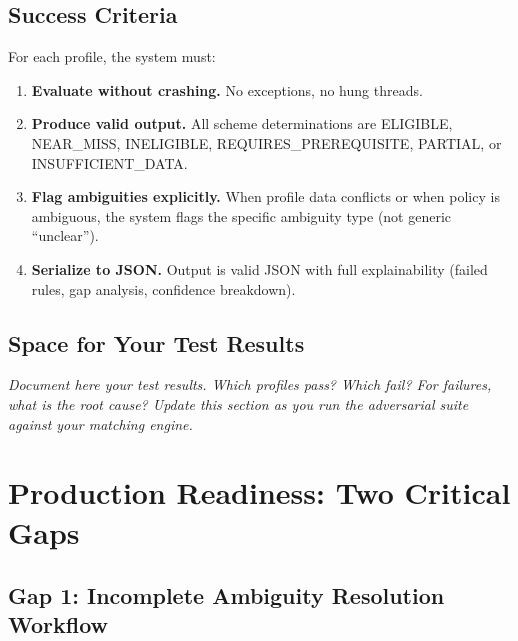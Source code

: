\documentclass[11pt,a4paper]{report}
\newenvironment{notebox}{%
  \begin{callout}%
}{%
  \end{callout}%
}
\begin{document}
\section{Success Criteria}

For each profile, the system must:

\begin{enumerate}
  \item \textbf{Evaluate without crashing.} No exceptions, no hung threads.
  \item \textbf{Produce valid output.} All scheme determinations are ELIGIBLE, NEAR\_MISS, INELIGIBLE, REQUIRES\_PREREQUISITE, PARTIAL, or INSUFFICIENT\_DATA.
  \item \textbf{Flag ambiguities explicitly.} When profile data conflicts or when policy is ambiguous, the system flags the specific ambiguity type (not generic ``unclear'').
  \item \textbf{Serialize to JSON.} Output is valid JSON with full explainability (failed rules, gap analysis, confidence breakdown).
\end{enumerate}

\section{Space for Your Test Results}

\begin{notebox}
\Large\vspace{4cm}

\noindent\textcolor{dark}{\emph{Document here your test results. Which profiles pass? Which fail? For failures, what is the root cause? Update this section as you run the adversarial suite against your matching engine.}}

\vspace{4cm}
\end{notebox}

\chapter{Production Readiness: Two Critical Gaps}

\section{Gap 1: Incomplete Ambiguity Resolution Workflow}
\end{document}
